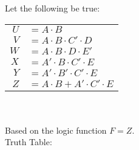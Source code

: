 Let the following be true:\\
\begin{tabular}{rl}
  $U$ & $= A \cdot B$\\
  $V$ & $= A \cdot B \cdot C' \cdot D$\\
  $W$ & $= A \cdot B \cdot D \cdot E'$\\
  $X$ & $= A' \cdot B \cdot C' \cdot E$\\
  $Y$ & $= A' \cdot B' \cdot C' \cdot E$\\
  $Z$ & $= A \cdot B + A' \cdot C' \cdot E$\\
\end{tabular}\\ \\
Based on the logic function $F=Z$.\\
Truth Table:\\
